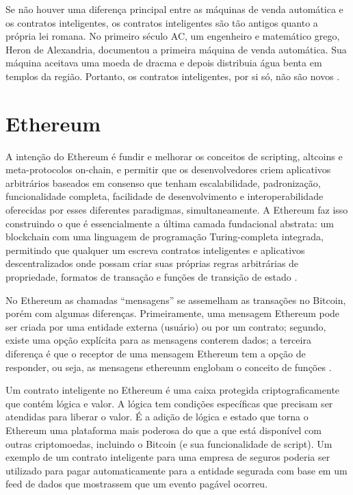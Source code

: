         Se não houver uma diferença principal entre as máquinas de venda automática e os contratos inteligentes, os contratos inteligentes são tão antigos quanto a própria lei romana. No primeiro século AC, um engenheiro e matemático grego, Heron de Alexandria, documentou a primeira máquina de venda automática. Sua máquina aceitava uma moeda de dracma e depois distribuia água benta em templos da região. Portanto, os contratos inteligentes, por si só, não são novos \cite{blockchain_pratical_guide}.
        



\section{Ethereum}


A intenção do Ethereum é fundir e melhorar os conceitos de scripting, altcoins e meta-protocolos on-chain, e permitir que os desenvolvedores criem aplicativos arbitrários baseados em consenso que tenham escalabilidade, padronização, funcionalidade completa, facilidade de desenvolvimento e interoperabilidade oferecidas por esses diferentes paradigmas, simultaneamente. A Ethereum faz isso construindo o que é essencialmente a última camada fundacional abstrata: um blockchain com uma linguagem de programação Turing-completa integrada, permitindo que qualquer um escreva contratos inteligentes e aplicativos descentralizados onde possam criar suas próprias regras arbitrárias de propriedade, formatos de transação e funções de transição de estado \cite{ethereum_white_paper}.

No Ethereum as chamadas “mensagens” se assemelham as transações no Bitcoin, porém com algumas diferenças. Primeiramente, uma mensagem Ethereum pode ser criada por uma entidade externa (usuário) ou por um contrato; segundo, existe uma opção explícita para as mensagens conterem dados; a terceira diferença é que o receptor de uma mensagem Ethereum tem a opção de responder, ou seja, as mensagens ethereunm englobam o conceito de funções \cite{ethereum_white_paper}.

Um contrato inteligente no Ethereum é uma caixa protegida criptograficamente que contém lógica e valor. A lógica tem condições específicas que precisam ser atendidas para liberar o valor. É a adição de lógica e estado que torna o Ethereum uma plataforma mais poderosa do que a que está disponível com outras criptomoedas, incluindo o Bitcoin (e sua funcionalidade de script). Um exemplo de um contrato inteligente para uma empresa de seguros poderia ser utilizado para pagar automaticamente para a entidade segurada com base em um feed de dados que mostrassem que um evento pagável ocorreu.\cite{blockchain_pratical_guide}

